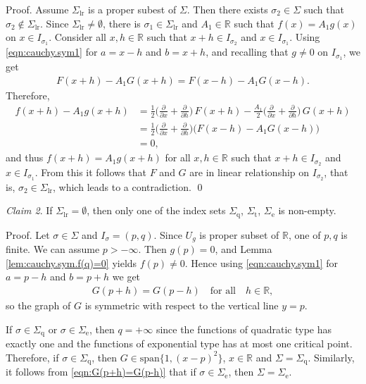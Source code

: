 \documentclass{birkjour}
\begin{document}
\smallskip
\noindent
Proof. Assume $\Sigma_{\textrm{lr}}$ is a proper subest of $\Sigma$. Then there exists $\sigma_2\in\Sigma$ such that $\sigma_2\notin\Sigma_{\textrm{lr}}$. Since $\Sigma_{\textrm{lr}} \neq \emptyset$, there is $\sigma_1 \in \Sigma_{\textrm{lr}}$ and $A_1\in{{\mathbb R}}$ such that $f(x)=A_1g(x)$ on $x\in I_{\sigma_1}$. Consider all $x,h\in{{\mathbb R}}$ such that $x+h \in I_{\sigma_2}$ and $x\in I_{\sigma_1}$. Using \eqref{eqn:cauchy.sym1} for $a=x-h$ and $b=x+h$, and recalling that $g\neq 0$ on $I_{\sigma_1}$, we get
\begin{align}
F(x+h)-A_1G(x+h) = F(x-h) - A_1G(x-h).
\end{align}
Therefore, 
\begin{align*}
f(x+h) - A_1g(x+h) &= \frac{1}{2}\bigg(\frac{\partial}{\partial x} + \frac{\partial}{\partial h}\bigg) \, F(x+h) - \frac{A_1}{2}\bigg(\frac{\partial}{\partial x} + \frac{\partial}{\partial h}\bigg) \, G(x+h)\\
                   &= \frac{1}{2}\bigg(\frac{\partial}{\partial x} + \frac{\partial}{\partial h}\bigg) \bigl(F(x-h) - A_1G(x-h)\bigr) \\
                   &= 0,
\end{align*}
and thus $f(x+h) = A_1g(x+h)$ for all $x,h\in{{\mathbb R}}$ such that $x+h \in I_{\sigma_2}$ and $x\in I_{\sigma_1}$. From this it follows that $F$ and $G$ are in linear relationship on $I_{\sigma_2}$, that is, $\sigma_2 \in \Sigma_{\textrm{lr}}$, which leads to a contradiction. \qed

\smallskip
\noindent
\textit{Claim 2}. If $\Sigma_{\textrm{lr}} = \emptyset$, then only one of the index sets  $\Sigma_{\textrm{q}}$, $\Sigma_{\textrm{t}}$, $\Sigma_{\textrm{e}}$ is non-empty. 

\smallskip
\noindent
Proof. Let $\sigma\in \Sigma$ and $I_{\sigma} = (p,q)$. Since $U_g$ is proper subset of ${{\mathbb R}}$, one of $p,q$ is finite. We can assume $p>-\infty$. Then $g(p)=0$, and Lemma \ref{lem:cauchy.sym.f(q)=0} yields $f(p)\neq 0$. Hence using \eqref{eqn:cauchy.sym1} for $a=p-h$ and $b=p+h$ we get 
\begin{align}
\label{eqn:G(p+h)=G(p-h)}
G(p+h)=G(p-h) \quad \text{for all} \quad h\in{{\mathbb R}},
\end{align}
so the graph of $G$ is symmetric with respect to the vertical line $y=p$. 

If $\sigma\in\Sigma_{\textrm{q}}$ or $\sigma\in\Sigma_{\textrm{e}}$, then $q=+\infty$ since the functions of quadratic type has exactly one and the functions of exponential type has at most one critical point. Therefore, if $\sigma\in\Sigma_{\textrm{q}}$, then 
$G \in \text{span} \{1, (x-p)^2\}$, $x\in{{\mathbb R}}$ and $\Sigma = \Sigma_{\textrm{q}}$. Similarly, it follows from \eqref{eqn:G(p+h)=G(p-h)} that if $\sigma\in\Sigma_{\textrm{e}}$, then $\Sigma = \Sigma_{\textrm{e}}$. 
\end{document}
